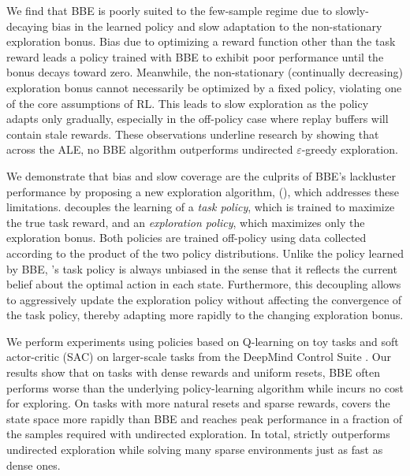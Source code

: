 We find that BBE is poorly suited to the few-sample regime due to slowly-decaying bias in the learned policy and slow adaptation to the non-stationary exploration bonus.
Bias due to optimizing a reward function other than the task reward leads a policy trained with BBE to exhibit poor performance until the bonus decays toward zero.
Meanwhile, the non-stationary (continually decreasing) exploration bonus cannot necessarily be optimized by a fixed policy, violating one of the core assumptions of RL.
This leads to slow exploration as the policy adapts only gradually, especially in the off-policy case where replay buffers will contain stale rewards.
These observations underline research by \citet{Taiga2020On} showing that across the ALE, no BBE algorithm outperforms undirected $\varepsilon$-greedy exploration.

We demonstrate that bias and slow coverage are the culprits of BBE's lackluster performance by proposing a new exploration algorithm, \algname{} (\algshort{}), which addresses these limitations.
\algshort{} decouples the learning of a \emph{task policy}, which is trained to maximize the true task reward, and an \emph{exploration policy}, which maximizes only the exploration bonus.
Both policies are trained off-policy using data collected according to the product of the two policy distributions.
Unlike the policy learned by BBE, \algshort{}'s task policy is always unbiased in the sense that it reflects the current belief about the optimal action in each state.
Furthermore, this decoupling allows \algshort{} to aggressively update the exploration policy without affecting the convergence of the task policy, thereby adapting more rapidly to the changing exploration bonus.

We perform experiments using policies based on Q-learning \citep{sutton2018reinforcement,mnih2015human} on toy tasks and soft actor-critic (SAC) \citep{haarnoja2018softapp} on larger-scale tasks from the DeepMind Control Suite \citep{tassa2018deepmind}.
Our results show that on tasks with dense rewards and uniform resets, BBE often performs worse than the underlying policy-learning algorithm while \algshort{} incurs no cost for exploring.
On tasks with more natural resets and sparse rewards, \algshort{} covers the state space more rapidly than BBE and reaches peak performance in a fraction of the samples required with undirected exploration.
In total, \algshort{} strictly outperforms undirected exploration while solving many sparse environments just as fast as dense ones.


